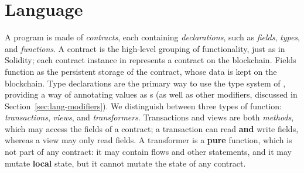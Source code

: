 \documentclass[dvipsnames, usenames, sigconf]{acmart}
\begin{document}

\section{Language}\label{sec:lang}
A \langName program is made of \emph{contracts}, each containing \emph{declarations}, such as \emph{fields}, \emph{types}, and \emph{functions}.
A contract is the high-level grouping of functionality, just as in Solidity; each contract instance in \langName represents a contract on the blockchain.
Fields function as the persistent storage of the contract, whose data is kept on the blockchain.
Type declarations are the primary way to use the type system of \langName, providing a way of annotating values as \assetTxt{}s (as well as other modifiers, discussed in Section~\ref{sec:lang-modifiers}).
We distinguish between three types of function: \emph{transactions}, \emph{views}, and \emph{transformers}.
Transactions and views are both \emph{methods}, which may access the fields of a contract; a transaction can read \textbf{and} write fields, whereas a view may only read fields.
A transformer is a \textbf{pure} function, which is not part of any contract: it may contain flows and other statements, and it may mutate \textbf{local} state, but it cannot mutate the state of any contract.
\end{document}
